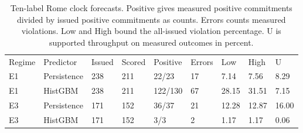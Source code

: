 \begin{table}[!ht]
\centering\footnotesize\setlength{\tabcolsep}{3.5pt}
\caption{Ten-label Rome clock forecasts. Positive gives measured positive commitments divided by issued positive commitments as counts. Errors counts measured violations. Low and High bound the all-issued violation percentage. U is supported throughput on measured outcomes in percent.}
\begin{tabular}{lllllllll}
\hline
Regime & Predictor & Issued & Scored & Positive & Errors & Low & High & U \\
E1 & Persistence & 238 & 211 & 22/23 & 17 & 7.14 & 7.56 & 8.29 \\
E1 & HistGBM & 238 & 211 & 122/130 & 67 & 28.15 & 31.51 & 7.15 \\
E3 & Persistence & 171 & 152 & 36/37 & 21 & 12.28 & 12.87 & 16.00 \\
E3 & HistGBM & 171 & 152 & 3/3 & 2 & 1.17 & 1.17 & 0.06 \\
\hline
\end{tabular}
\end{table}
